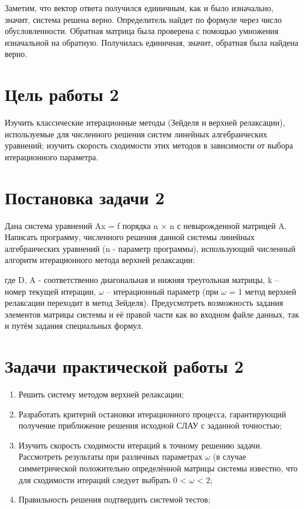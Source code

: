 \documentclass[a4paper,12pt,titlepage,finall]{article}
\begin{document}
Заметим, что вектор ответа получился единичным, как и было изначально, значит, система решена верно. Определитель найдет по формуле через число обусловленности. Обратная матрица была проверена с помощью умножения изначальной на обратную. Получилась единичная, значит, обратная была найдена верно.


\newpage


\section{Цель работы 2}
Изучить классические итерационные методы (Зейделя и верхней релаксации),
используемые для численного решения систем линейных алгебраических уравнений;
изучить скорость сходимости этих методов в зависимости от выбора итерационного
параметра.
\section{Постановка задачи 2}
Дана система уравнений Ax = f порядка n × n с невырожденной матрицей A. Написать
программу, численного решения данной системы линейных алгебраических уравнений
(n - параметр программы), использующий численный алгоритм итерационного метода
верхней релаксации:

где D, A - соответственно диагональная и нижняя треугольная матрицы,
k – номер текущей итерации, $\omega$ – итерационный параметр (при $\omega$ = 1 метод верхней
релаксации переходит в метод Зейделя).
Предусмотреть возможность задания элементов матрицы системы и её правой части
как во входном файле данных, так и путём задания специальных формул.
\section{Задачи практической работы 2}
\begin{enumerate}
\item Решить систему методом верхней релаксации;
\item Разработать критерий остановки итерационного процесса, гарантирующий
получение приближение решения исходной СЛАУ с заданной точностью;
\item Изучить скорость сходимости итераций к точному решению задачи. Рассмотреть
результаты при различных параметрах $\omega$ (в случае симметрической
положительно определённой матрицы системы известно, что для сходимости
итераций следует выбрать 0 < $\omega$ < 2;
\item Правильность решения подтвердить системой тестов;
\end{enumerate}
\newpage
\end{document}

